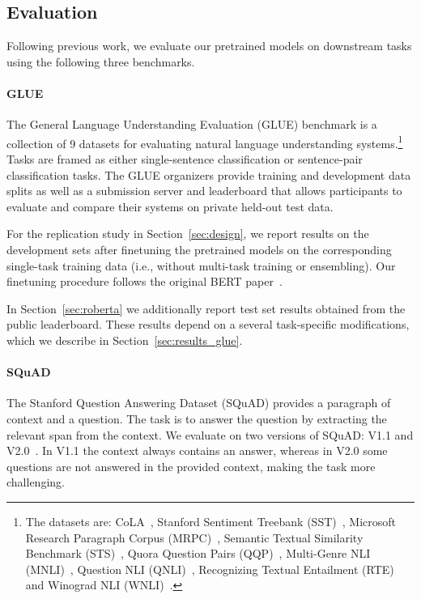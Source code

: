 \documentclass[11pt]{article}
\begin{document}
\subsection{Evaluation} \label{sec:evaluation}

Following previous work, we evaluate our pretrained models on downstream tasks using the following three benchmarks.

\paragraph{GLUE} \label{sec:glue}

The General Language Understanding Evaluation (GLUE) benchmark \cite{wang2019glue} is a collection of 9 datasets for evaluating natural language understanding systems.\footnote{The datasets are: CoLA~\cite{warstadt2018neural}, Stanford Sentiment Treebank (SST)~\cite{socher2013recursive}, Microsoft Research Paragraph Corpus (MRPC)~\cite{dolan2005automatically}, Semantic Textual Similarity Benchmark (STS)~\cite{agirre2007semantic}, Quora Question Pairs (QQP)~\cite{iyer2016quora}, Multi-Genre NLI (MNLI)~\cite{williams2018broad}, Question NLI (QNLI)~\cite{rajpurkar2016squad}, Recognizing Textual Entailment (RTE)~\cite{dagan2006pascal,bar2006second,giampiccolo2007third,bentivogli2009fifth} and Winograd NLI (WNLI)~\cite{levesque2011winograd}.}
Tasks are framed as either single-sentence classification or sentence-pair classification tasks.
The GLUE organizers provide training and development data splits as well as a submission server and leaderboard that allows participants to evaluate and compare their systems on private held-out test data.

For the replication study in Section~\ref{sec:design}, we report results on the development sets after finetuning the pretrained models on the corresponding single-task training data (i.e., without multi-task training or ensembling).
Our finetuning procedure follows the original BERT paper~\cite{devlin2018bert}.

In Section~\ref{sec:roberta} we additionally report test set results obtained from the public leaderboard. These results depend on a several task-specific modifications, which we describe in Section~\ref{sec:results_glue}.

\paragraph{SQuAD} \label{sec:squad}
The Stanford Question Answering Dataset (SQuAD) provides a paragraph of context and a  question.
The task is to answer the question by extracting the relevant span from the context.
We evaluate on two versions of SQuAD: V1.1 and V2.0~\cite{rajpurkar2016squad,rajpurkar2018know}.
In V1.1 the context always contains an answer, whereas in V2.0 some questions are not answered in the provided context, making the task more challenging.
\end{document}
